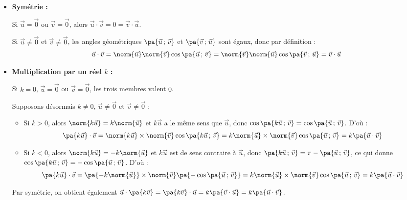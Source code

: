 \begin{demonstration}
	\nline
	\begin{itemize}
		\item \textbf{Symétrie :}

		      Si $\vec{u} = \vec{0}$ ou $\vec{v} = \vec{0}$, alors $\vec{u} \cdot \vec{v} = 0 = \vec{v} \cdot \vec{u}$.

		      Si $\vec{u} \neq \vec{0}$ et $\vec{v} \neq \vec{0}$, les angles géométriques $\pa{\vec{u}\,;\,\vec{v}}$ et $\pa{\vec{v}\,;\,\vec{u}}$ sont égaux, donc par définition :
		      \[
			      \vec{u} \cdot \vec{v} = \norm{\vec{u}}\norm{\vec{v}}\cos\pa{\vec{u}\,;\,\vec{v}} = \norm{\vec{v}}\norm{\vec{u}}\cos\pa{\vec{v}\,;\,\vec{u}} = \vec{v} \cdot \vec{u}
		      \]

		\item \textbf{Multiplication par un réel $k$ :}

		      Si $k = 0$, $\vec{u} = \vec{0}$ ou $\vec{v} = \vec{0}$, les trois membres valent $0$.

		      Supposons désormais $k \neq 0$, $\vec{u} \neq \vec{0}$ et $\vec{v} \neq \vec{0}$ :
		      \begin{itemize}
			      \item Si $k > 0$, alors $\norm{k\vec{u}} = k\norm{\vec{u}}$ et $k\vec{u}$ a le même sens que $\vec{u}$, donc $\cos\pa{k\vec{u}\,;\,\vec{v}} = \cos\pa{\vec{u}\,;\,\vec{v}}$. D'où :
			            \[
				            \pa{k\vec{u}} \cdot \vec{v} = \norm{k\vec{u}}\times \norm{\vec{v}}\cos\pa{k\vec{u}\,;\,\vec{v}} = k\norm{\vec{u}}\times\norm{\vec{v}}\cos\pa{\vec{u}\,;\,\vec{v}} = k\pa{\vec{u} \cdot \vec{v}}
			            \]
			      \item Si $k < 0$, alors $\norm{k\vec{u}} = -k\norm{\vec{u}}$ et $k\vec{u}$ est de sens contraire à $\vec{u}$, donc $\pa{k\vec{u}\,;\,\vec{v}} = \pi - \pa{\vec{u}\,;\,\vec{v}}$, ce qui donne $\cos\pa{k\vec{u}\,;\,\vec{v}} = -\cos\pa{\vec{u}\,;\,\vec{v}}$. D'où :
			            \[
				            \pa{k\vec{u}} \cdot \vec{v} = \pa{-k\norm{\vec{u}}}\times\norm{\vec{v}}\pa{-\cos\pa{\vec{u}\,;\,\vec{v}}} = k\norm{\vec{u}}\times\norm{\vec{v}}\cos\pa{\vec{u}\,;\,\vec{v}} = k\pa{\vec{u} \cdot \vec{v}}
			            \]
		      \end{itemize}

		      Par symétrie, on obtient également $\vec{u} \cdot \pa{k\vec{v}} = \pa{k\vec{v}} \cdot \vec{u} = k\pa{\vec{v} \cdot \vec{u}} = k\pa{\vec{u} \cdot \vec{v}}$.
	\end{itemize}


\end{demonstration}
